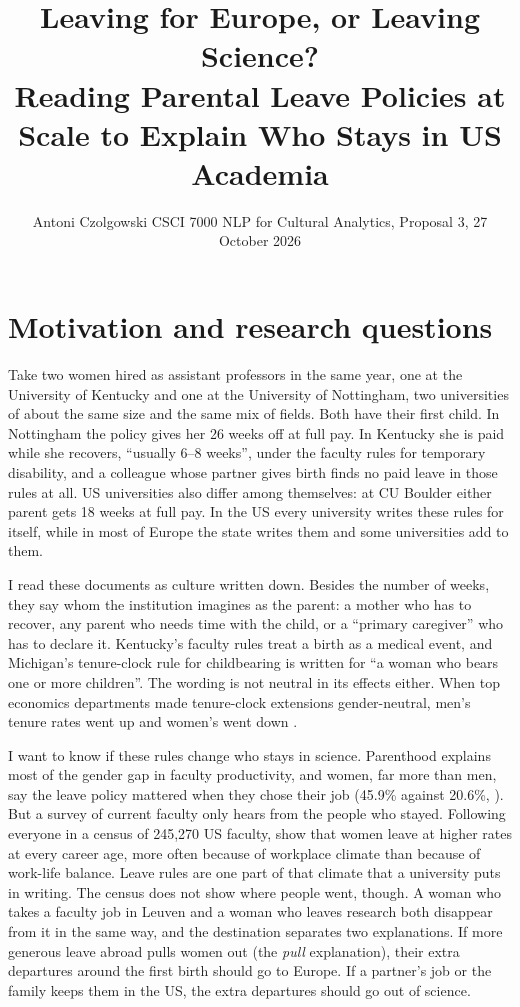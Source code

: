 \documentclass[10pt,twocolumn]{article}
\title{\vspace{-0.62in}\large\textbf{Leaving for Europe, or Leaving Science?}\\[2pt]\normalsize Reading Parental Leave Policies at Scale to Explain Who Stays in US Academia}
\author{\normalsize Antoni Czolgowski \quad CSCI 7000 NLP for Cultural Analytics, Proposal 3, 27 October 2026}
\date{\vspace{-0.32in}}
\begin{document}
\maketitle

\section{Motivation and research questions}
Take two women hired as assistant professors in the same year, one at the University of Kentucky and one at the University of Nottingham, two universities of about the same size and the same mix of fields. Both have their first child. In Nottingham the policy gives her 26 weeks off at full pay. In Kentucky she is paid while she recovers, ``usually 6--8 weeks'', under the faculty rules for temporary disability, and a colleague whose partner gives birth finds no paid leave in those rules at all. US universities also differ among themselves: at CU Boulder either parent gets 18 weeks at full pay. In the US every university writes these rules for itself, while in most of Europe the state writes them and some universities add to them.

I read these documents as culture written down. Besides the number of weeks, they say whom the institution imagines as the parent: a mother who has to recover, any parent who needs time with the child, or a ``primary caregiver'' who has to declare it. Kentucky's faculty rules treat a birth as a medical event, and Michigan's tenure-clock rule for childbearing is written for ``a woman who bears one or more children''. The wording is not neutral in its effects either. When top economics departments made tenure-clock extensions gender-neutral, men's tenure rates went up and women's went down \citep{antecol2018}.

I want to know if these rules change who stays in science. Parenthood explains most of the gender gap in faculty productivity, and women, far more than men, say the leave policy mattered when they chose their job (45.9\% against 20.6\%, \citealp{morgan2021}). But a survey of current faculty only hears from the people who stayed. Following everyone in a census of 245,270 US faculty, \citet{spoon2023} show that women leave at higher rates at every career age, more often because of workplace climate than because of work-life balance. Leave rules are one part of that climate that a university puts in writing. The census does not show where people went, though. A woman who takes a faculty job in Leuven and a woman who leaves research both disappear from it in the same way, and the destination separates two explanations. If more generous leave abroad pulls women out (the \emph{pull} explanation), their extra departures around the first birth should go to Europe. If a partner's job or the family keeps them in the US, the extra departures should go out of science.
\end{document}
